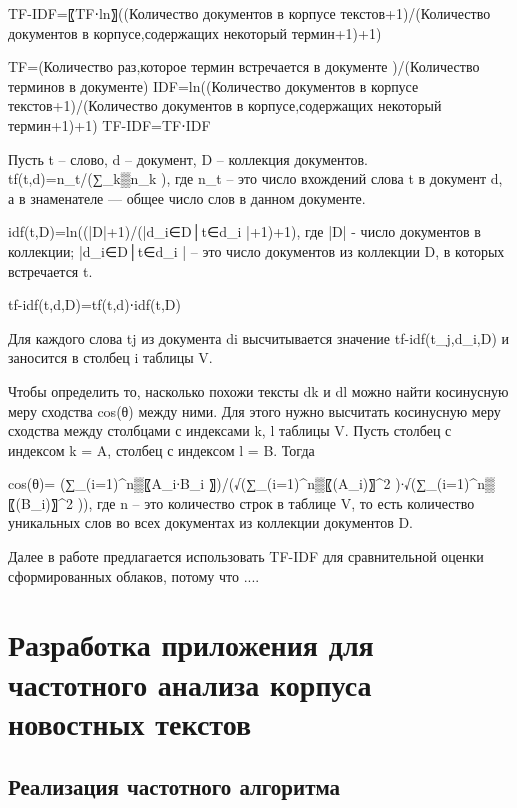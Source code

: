 \documentclass[bachelor, och, coursework ]{SCWorks}
\begin{document}
TF-IDF=〖TF⋅ln〗⁡((Количество документов в корпусе текстов+1)/(Количество документов в корпусе,содержащих некоторый термин+1)+1)

TF=(Количество раз,которое термин встречается в документе )/(Количество терминов в документе)
IDF=ln⁡((Количество документов в корпусе текстов+1)/(Количество документов в корпусе,содержащих некоторый термин+1)+1)
TF-IDF=TF⋅IDF




	Пусть t – слово, d – документ, D – коллекция документов.
tf(t,d)=n_t/(∑_k▒n_k ),
где  n_t – это число вхождений слова t в документ d, а в знаменателе — общее число слов в данном документе.

idf(t,D)=ln⁡((|D|+1)/(|{d_i∈D│t∈d_i }|+1)+1),
где |D| - число документов в коллекции;
|{d_i∈D│t∈d_i }| – это число документов из коллекции D, в которых встречается t.

tf-idf(t,d,D)=tf(t,d)⋅idf(t,D)

Для каждого слова tj из документа di высчитывается значение tf-idf(t_j,d_i,D) и заносится в столбец i таблицы V.

Чтобы определить то, насколько похожи тексты dk и dl можно найти косинусную меру сходства cos⁡(θ) между ними. Для этого нужно высчитать косинусную меру сходства между столбцами с индексами k, l таблицы V. Пусть столбец с индексом k = A, столбец с индексом l = B. Тогда  
	
cos⁡(θ)=  (∑_(i=1)^n▒〖A_i∙B_i 〗)/(√(∑_(i=1)^n▒〖(A_i)〗^2 )∙√(∑_(i=1)^n▒〖(B_i)〗^2 )), где n – это количество строк в таблице V, то есть количество уникальных слов во всех документах из коллекции документов D.


Далее в работе предлагается использовать TF-IDF для сравнительной оценки сформированных облаков, потому что ....








\section{Разработка приложения для частотного анализа корпуса новостных текстов}
\subsection{Реализация частотного алгоритма}
\end{document}
